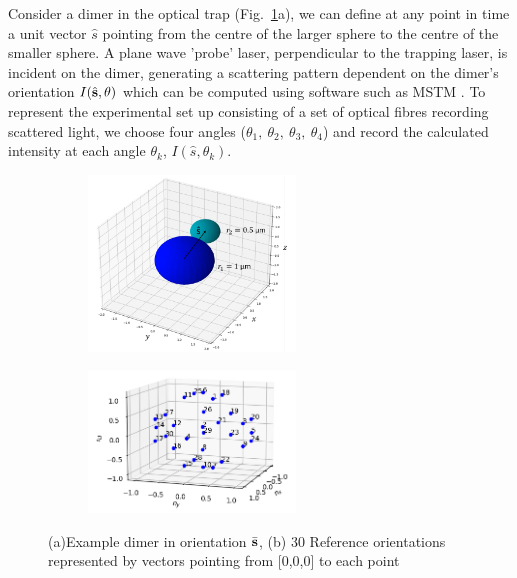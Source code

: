 \documentclass[12pt]{spieman}
\begin{document}
\begin{spacing}{1.5}
Consider a dimer in the optical trap (Fig.~\ref{fig:dimer}a), we can define at any point in time a unit vector $\hat{s}$ pointing from the centre of the larger sphere to the centre of the smaller sphere. A plane wave 'probe' laser, perpendicular to the trapping laser, is incident on the dimer, generating a scattering pattern  dependent on the dimer's orientation $I(\hat{\bf s}, \theta)$ which can be computed using  software such as MSTM \cite{Mishchenko1996MSTM}. To represent the experimental set up consisting of a set of optical fibres recording scattered light, we choose four angles  ($\theta_1, \ \theta_2, \ \theta_3, \ \theta_4$) and record the calculated intensity at each angle $\theta_k$, $I(\hat{s}, \theta_k)$. 

\begin{figure}[h]
	\centering
	\begin{subfigure}{0.45\textwidth}
		\subcaption{}
		\includegraphics[width=5.5cm]{./Images/fig2a.png}
	\end{subfigure}
	\begin{subfigure}{0.45\textwidth}
		\subcaption{}
		\includegraphics[width=5.5cm]{./Images/fig2b.png}
	\end{subfigure}
	\caption{(a)Example dimer in orientation $\bar{\bf s}$, (b) 30 Reference orientations represented by vectors pointing from [0,0,0] to each point}
	\label{fig:dimer}
\end{figure}


\end{spacing}
\end{document}
